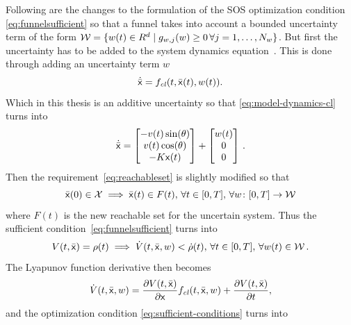 Following are the changes to the formulation of the \ac{SOS} optimization
condition \cref{eq:funnelsufficient} so that a funnel takes into account a
bounded uncertainty term of the form \(\mathcal{W} = \lbrace w(t) \in R^d \mid
  g_{w,j}(w) \geq 0\, \forall j = 1,\ldots,N_w\rbrace\). But first the uncertainty has
to be added to the system dynamics
equation~\cite{majumdarRobustOnlineMotion2013}. This is done through adding an
uncertainty term \(w\)
\begin{equation}
  \dot{\bar{{\mathbf{\mathsf{x}}}}} = f_{\mathit{cl}}(t, \bar{{\mathbf{\mathsf{x}}}}(t), w(t)).
\end{equation}
Which in this thesis is an additive uncertainty so that
\cref{eq:model-dynamics-cl} turns into
\begin{equation}
  \dot{\bar{\vect{x}}} = %
  \begin{bmatrix}
    -v(t)\sin(\theta) \\
    v(t)\cos(\theta) \\
    -K\vect{x} (t) \\
  \end{bmatrix}
  +
  \begin{bmatrix}
    w(t) \\
    0 \\
    0
  \end{bmatrix} \mathEoS
\end{equation}
Then the requirement~\cref{eq:reachableset} is slightly modified so that
\begin{equation}
  \label{eq:uncertain-reachableset}
  \bar{{\mathbf{\mathsf{x}}}}(0) \in \mathcal{X} \implies \bar{{\mathbf{\mathsf{x}}}}(t) \in F(t),\, \forall t \in
  [0,T], \, \forall w \colon [0,T] \rightarrow \mathcal{W}
\end{equation} 
where \(F(t)\) is the new reachable set for the uncertain system. Thus the
sufficient condition~\cref{eq:funnelsufficient} turns into
\begin{equation}
  \label{eq:funneluncertain-sufficient}
  V(t,\bar{{\mathbf{\mathsf{x}}}}) = \rho(t) \implies \dot{V}(t,\bar{{\mathbf{\mathsf{x}}}},w) < \dot{\rho}(t), \, \forall t \in [0,T], \, \forall w(t) \in \mathcal{W} \, .
\end{equation}
The Lyapunov function derivative then becomes
\begin{equation}
  \dot{V}(t,\bar{{\mathbf{\mathsf{x}}}}, w) = \frac{\partial V(t,\bar{{\mathbf{\mathsf{x}}}})}{\partial {\mathbf{\mathsf{x}}}} f_{\mathit{cl}}(t,\bar{{\mathbf{\mathsf{x}}}},w) + \frac{\partial V(t,\bar{{\mathbf{\mathsf{x}}}})}{\partial t},
\end{equation}
and the optimization condition \cref{eq:sufficient-conditions} turns into
